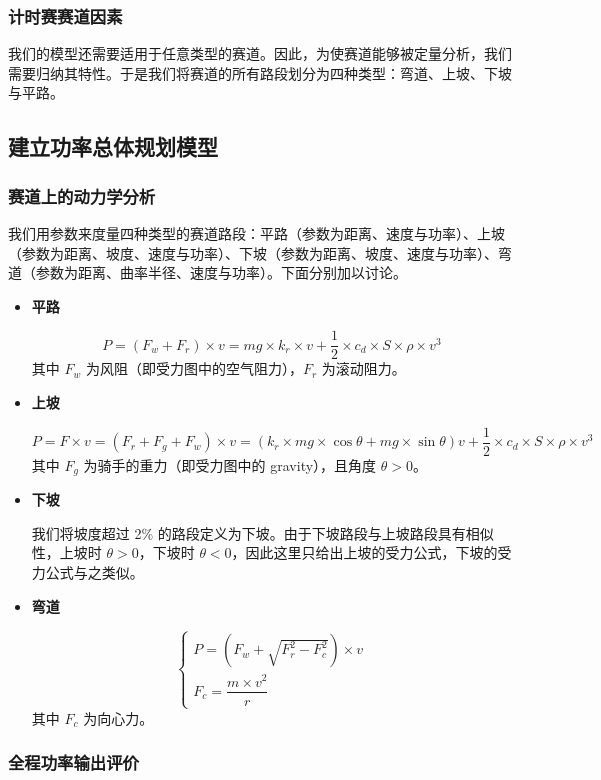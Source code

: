 \documentclass[11pt,a4paper]{ctexart}
\begin{document}
\subsubsection{计时赛赛道因素}

我们的模型还需要适用于任意类型的赛道。因此，为使赛道能够被定量分析，我们需要归纳其特性。于是我们将赛道的所有路段划分为四种类型：弯道、上坡、下坡与平路。
\subsection{建立功率总体规划模型}

\subsubsection{赛道上的动力学分析}

我们用参数来度量四种类型的赛道路段：平路（参数为距离、速度与功率）、上坡（参数为距离、坡度、速度与功率）、下坡（参数为距离、坡度、速度与功率）、弯道（参数为距离、曲率半径、速度与功率）。下面分别加以讨论。

\begin{itemize}
\item \textbf{平路}

\[
P=(F_w+F_r)\times v=mg\times k_r\times v+\frac{1}{2}\times c_d\times S\times \rho\times v^{3}
\]
其中 $F_w$ 为风阻（即受力图中的空气阻力），$F_r$ 为滚动阻力。

\item \textbf{上坡}

\[
P=F\times v=(F_r+F_g+F_w)\times v=\left(k_r\times mg\times \cos\theta+mg\times \sin\theta\right)v+\frac{1}{2}\times c_d\times S\times \rho\times v^{3}
\]
其中 $F_g$ 为骑手的重力（即受力图中的 gravity），且角度 $\theta>0$。

\item \textbf{下坡}

我们将坡度超过 2\% 的路段定义为下坡。由于下坡路段与上坡路段具有相似性，上坡时 $\theta>0$，下坡时 $\theta<0$，因此这里只给出上坡的受力公式，下坡的受力公式与之类似。

\item \textbf{弯道}

\[
\begin{cases}
P=\left(F_w+\sqrt{F_r^{2}-F_c^{2}}\right)\times v\\[0.5em]
F_c=\dfrac{m\times v^{2}}{r}
\end{cases}
\]
其中 $F_c$ 为向心力。
\end{itemize}

\subsubsection{全程功率输出评价}
\end{document}
